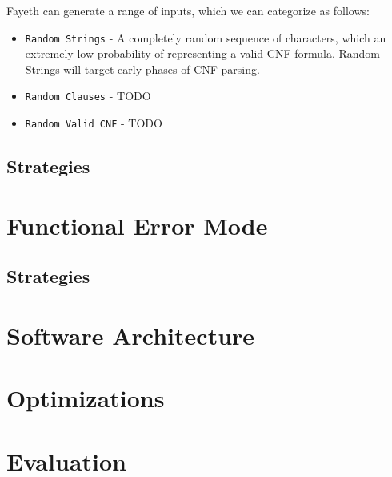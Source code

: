 \documentclass{article}
\begin{document}
Fayeth can generate a range of inputs, which we can categorize as follows:

\begin{itemize}

\item \verb|Random Strings| - A completely random sequence of characters, which an extremely low probability of representing a valid CNF formula. Random Strings will target early phases of CNF parsing.

\item \verb|Random Clauses| - TODO

\item \verb|Random Valid CNF| - TODO

\end{itemize}

\subsection{Strategies}

\subsection{}

\section{Functional Error Mode}

\subsection{Strategies}

\section{Software Architecture}

\section{Optimizations}

\section{Evaluation}
\end{document}
